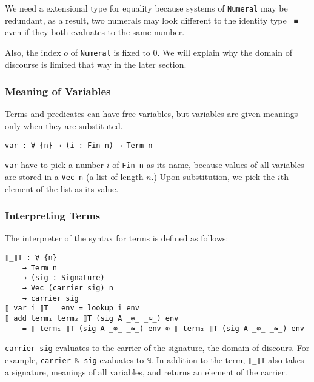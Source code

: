\documentclass[\main/thesis.tex]{subfiles}
\begin{document}

We need a extensional type for equality because systems of \lstinline|Numeral|
may be redundant, as a result, two numerals may look different to the identity
type \lstinline|_≡_| even if they both evaluates to the same number.

Also, the index $ o $ of \lstinline|Numeral| is fixed to $ 0 $.
We will explain why the domain of discourse is limited that way in the
later section.

\subsubsection{Meaning of Variables}

Terms and predicates can have free variables, but variables are given
meanings only when they are substituted.

\begin{lstlisting}
var : ∀ {n} → (i : Fin n) → Term n
\end{lstlisting}

\lstinline|var| have to pick a number $ i $ of \lstinline|Fin n| as its name,
because values of all variables are stored in a \lstinline|Vec n| (a list of length $ n $.)
Upon substitution, we pick the $ i $th element of the list as its value.

\subsubsection{Interpreting Terms}

The interpreter of the syntax for terms is defined as follows:

\begin{lstlisting}[basicstyle=\ttfamily\scriptsize]
⟦_⟧T : ∀ {n}
    → Term n
    → (sig : Signature)
    → Vec (carrier sig) n
    → carrier sig
⟦ var i ⟧T _ env = lookup i env
⟦ add term₁ term₂ ⟧T (sig A _⊕_ _≈_) env
    = ⟦ term₁ ⟧T (sig A _⊕_ _≈_) env ⊕ ⟦ term₂ ⟧T (sig A _⊕_ _≈_) env
\end{lstlisting}

\lstinline|carrier sig| evaluates to the carrier of the signature, the domain
of discours. For example, \lstinline|carrier ℕ-sig| evaluates to \lstinline|ℕ|.
In addition to the term, \lstinline|⟦_⟧T| also takes a signature, meanings of
all variables, and returns an element of the carrier.
\end{document}
